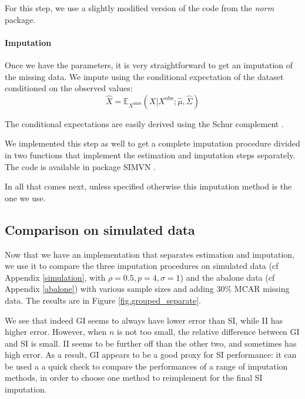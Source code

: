  For this step, we use a slightly modified version of the code from the \emph{norm} package.

\paragraph{Imputation}
Once we have the parameters, it is very straightforward to get an imputation of the missing data. We impute using the conditional expectation of the dataset conditioned on the observed values: 
$$\hat{X} = \mathbb{E}_{X^{\text{miss}}}(X \vert X^{\text{obs}} ; \hat{\mu}, \hat{\Sigma})$$

The conditional expectations are easily derived using the Schur complement \cite{norm_schur}.

We implemented this step as well to get a complete imputation procedure divided in two functions that implement the estimation and imputation steps separately. The code is available in package SIMVN \cite{SIMVN_github}.

In all that comes next, unless specified otherwise this imputation method is the one we use.
		\subsection{Comparison on simulated data}
Now that we have an implementation that separates estimation and imputation, we use it to compare the three imputation procedures on simulated data (cf Appendix \ref{simulation}, with $\rho=0.5, p=4, \sigma=1$) and the abalone data (cf Appendix \ref{abalone}) with various sample sizes and adding 30\% MCAR missing data. The results are in Figure \ref{fig.grouped_separate}.


	
We see that indeed GI seems to always have lower error than SI, while II has higher error. However, when $n$ is not too small, the relative difference between GI and SI is small. II seems to be further off than the other two, and sometimes has high error. As a result, GI appears to be a good proxy for SI performance: it can be used a a quick check to compare the performances of a range of imputation methods, in order to choose one method to reimplement for the final SI imputation.
